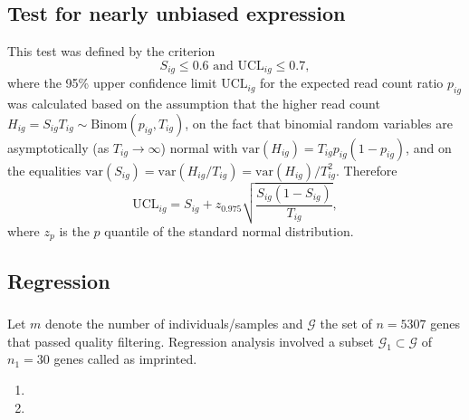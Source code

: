 \documentclass[letterpaper]{article}
\begin{document}
\subsection{}

\subsection{Test for nearly unbiased expression}

This test was defined by the criterion
\begin{equation}
S_{ig} \le 0.6 \text{ and } \mathrm{UCL}_{ig} \le 0.7,
\label{eq:unbiased-test}
\end{equation}
where the 95\% upper confidence limit \(\mathrm{UCL}_{ig}\) for the expected
read count ratio \(p_{ig}\) was calculated based on the assumption
that the higher read count \(H_{ig}=S_{ig}T_{ig}\sim \mathrm{Binom}(p_{ig},
T_{ig})\), on the fact that binomial random variables are
asymptotically (as \(T_{ig}\rightarrow \infty\)) normal with
\(\mathrm{var}(H_{ig}) = T_{ig}p_{ig}(1-p_{ig})\), and on the equalities
\(\mathrm{var}(S_{ig}) = \mathrm{var}(H_{ig}/T_{ig}) =
\mathrm{var}(H_{ig})/T_{ig}^2\).  Therefore
\begin{equation}
\mathrm{UCL}_{ig} = S_{ig} + z_{0.975} \sqrt{\frac{S_{ig} (1 - S_{ig})}{T_{ig}}},
\end{equation}
where $z_{p}$ is the $p$ quantile of the standard normal distribution.

\subsection{Regression }
\label{sec:methods-regression}

\subsubsection{}

Let \(m\) denote the number of individuals/samples and \(\mathcal{G}\) the set
of \(n=5307\) genes that passed quality filtering.  Regression analysis
involved a subset \(\mathcal{G}_1\subset\mathcal{G}\) of \(n_1=30\) genes
called as imprinted.

\begin{enumerate}
\item {}
\item {}
\end{enumerate}
\end{document}
